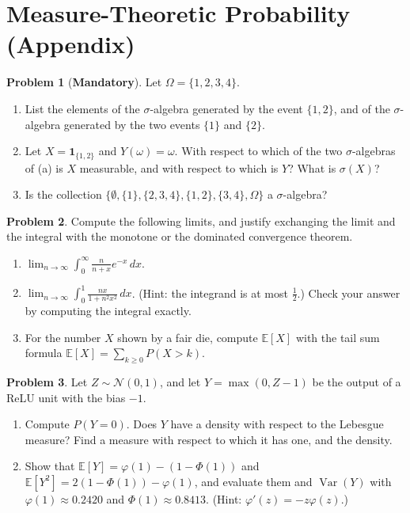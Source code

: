 \documentclass[11pt]{article}
\theoremstyle{definition}
\newtheorem{problem}{Problem}[section]
\newcommand{\mandatory}{\textcolor{red!70!black}{\textbf{Mandatory}}}
\newcommand{\E}{\mathbb{E}}
\DeclareMathOperator{\Var}{Var}
\begin{document}
\section{Measure-Theoretic Probability (Appendix)}

\begin{problem}[\mandatory]\label{pr:sigma-algebra}
    Let $\Omega = \{1, 2, 3, 4\}$.
    \begin{enumerate}[label=(\alph*)]
        \item List the elements of the $\sigma$-algebra generated by the event $\{1, 2\}$, and of the $\sigma$-algebra generated by the two events $\{1\}$ and $\{2\}$.
        \item Let $X = \mathbf{1}_{\{1, 2\}}$ and $Y(\omega) = \omega$. With respect to which of the two $\sigma$-algebras of (a) is $X$ measurable, and with respect to which is $Y$? What is $\sigma(X)$?
        \item Is the collection $\{\emptyset, \{1\}, \{2, 3, 4\}, \{1, 2\}, \{3, 4\}, \Omega\}$ a $\sigma$-algebra?
    \end{enumerate}
\end{problem}

\begin{problem}\label{pr:lebesgue-limits}
    Compute the following limits, and justify exchanging the limit and the integral with the monotone or the dominated convergence theorem.
    \begin{enumerate}[label=(\alph*)]
        \item $\displaystyle\lim_{n \to \infty}\int_0^\infty \frac{n}{n + x}e^{-x}\, dx$.
        \item $\displaystyle\lim_{n \to \infty}\int_0^1 \frac{nx}{1 + n^2x^2}\, dx$. (Hint: the integrand is at most $\frac{1}{2}$.) Check your answer by computing the integral exactly.
        \item For the number $X$ shown by a fair die, compute $\E[X]$ with the tail sum formula $\E[X] = \sum_{k \geq 0} P(X > k)$.
    \end{enumerate}
\end{problem}

\begin{problem}\label{pr:relu-shift}
    Let $Z \sim \mathcal{N}(0, 1)$, and let $Y = \max(0, Z - 1)$ be the output of a ReLU unit with the bias $-1$.
    \begin{enumerate}[label=(\alph*)]
        \item Compute $P(Y = 0)$. Does $Y$ have a density with respect to the Lebesgue measure? Find a measure with respect to which it has one, and the density.
        \item Show that $\E[Y] = \varphi(1) - (1 - \Phi(1))$ and $\E[Y^2] = 2(1 - \Phi(1)) - \varphi(1)$, and evaluate them and $\Var(Y)$ with $\varphi(1) \approx 0.2420$ and $\Phi(1) \approx 0.8413$. (Hint: $\varphi'(z) = -z\varphi(z)$.)
    \end{enumerate}
\end{problem}
\end{document}
